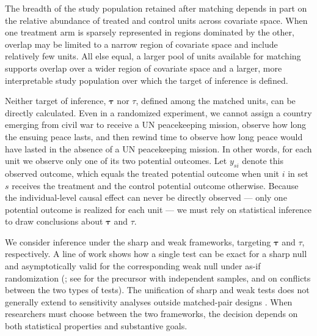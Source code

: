 \documentclass[twoside,11pt]{article}
\begin{document}
The breadth of the study population retained after matching depends in
part on the relative abundance of treated and control units across
covariate space. When one treatment arm is sparsely represented in
regions dominated by the other, overlap may be limited to a narrow
region of covariate space and include relatively few units. All else
equal, a larger pool of units available for matching supports overlap
over a wider region of covariate space and a larger, more interpretable
study population over which the target of inference is defined.

Neither target of inference, \(\bm{\tau}\) nor \(\tau\), defined among
the matched units, can be directly calculated. Even in a randomized
experiment, we cannot assign a country emerging from civil war to
receive a UN peacekeeping mission, observe how long the ensuing peace
lasts, and then rewind time to observe how long peace would have lasted
in the absence of a UN peacekeeping mission. In other words, for each
unit we observe only one of its two potential outcomes. Let \(y_{si}\)
denote this observed outcome, which equals the treated potential outcome
when unit \(i\) in set \(s\) receives the treatment and the control
potential outcome otherwise. Because the individual-level causal effect
can never be directly observed --- only one potential outcome is
realized for each unit --- we must rely on statistical inference to draw
conclusions about \(\bm{\tau}\) and \(\tau\).

We consider inference under the sharp and weak frameworks, targeting
\(\bm{\tau}\) and \(\tau\), respectively. A line of work shows how a single test can be exact for a sharp null and
asymptotically valid for the corresponding weak null under as-if
randomization
(\citealp{wuding2021, cohenfogarty2022, fogarty2023}; see
\citealp{chungromano2013} for the precursor with independent samples, and
\citealp{ding2017} on conflicts between the two types of tests). The
unification of sharp and weak tests does not generally extend to
sensitivity analyses outside matched-pair designs \citep[see][]{fogarty2020, fogarty2023}. When researchers must choose between the two frameworks, the
decision depends on both statistical properties and substantive goals.
\end{document}
